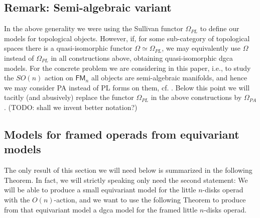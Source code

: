 \documentclass[a4paper]{amsart}
\theoremstyle{plain}
\theoremstyle{definition}
\newcommand{\FM}{\mathsf{FM}}
\newcommand{\SO}{\mathit{SO}}
\begin{document}
\subsection{Remark: Semi-algebraic variant}
In the above generality we were using the Sullivan functor $\Omega_{PL}$ to define our models for topological objects.
However, if, for some sub-category of topological spaces there is a quasi-isomorphic functor $\Omega \simeq \Omega_{PL}$, we may equivalently use $\Omega$ instead of $\Omega_{PL}$ in all constructions above, obtaining quasi-isomorphic dgca models.
For the concrete problem we are considering in this paper, i.e., to study the $\SO(n)$ action on $\FM_n$ all objects are semi-algebraic manifolds, and hence we may consider PA instead of PL forms on them, cf. \cite{HLTV}.
Below this point we will tacitly (and abusively) replace the functor $\Omega_{PL}$ in the above constructions by $\Omega_{PA}$. (TODO: shall we invent better notation?)


\subsection{Models for framed operads from equivariant models}
The only result of this section we will need below is summarized in the following Theorem.
In fact, we will strictly speaking only need the second statement: We will be able to produce a small equivariant model for the little $n$-disks operad with the $O(n)$-action, and we want to use the following Theorem to produce from that equivariant model a dgca model for the framed little $n$-disks operad.
\end{document}
